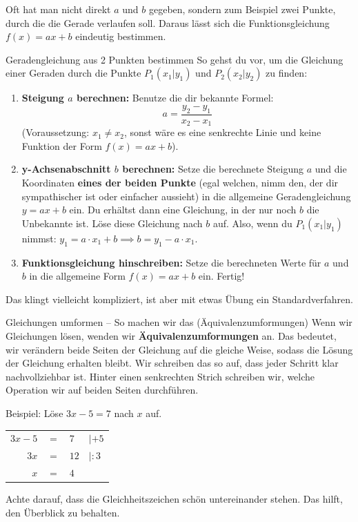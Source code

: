 Oft hat man nicht direkt $a$ und $b$ gegeben, sondern zum Beispiel zwei Punkte, durch die die Gerade verlaufen soll. Daraus lässt sich die Funktionsgleichung $f(x) = ax + b$ eindeutig bestimmen.

\begin{merksatzumgebung}{Geradengleichung aus 2 Punkten bestimmen}
So gehst du vor, um die Gleichung einer Geraden durch die Punkte $P_1(x_1|y_1)$ und $P_2(x_2|y_2)$ zu finden:
\begin{enumerate}
    \item \textbf{Steigung $a$ berechnen:}
    Benutze die dir bekannte Formel:
    \[ a = \frac{y_2 - y_1}{x_2 - x_1} \]
    (Voraussetzung: $x_1 \neq x_2$, sonst wäre es eine senkrechte Linie und keine Funktion der Form $f(x)=ax+b$).

    \item \textbf{y-Achsenabschnitt $b$ berechnen:}
    Setze die berechnete Steigung $a$ und die Koordinaten \textbf{eines der beiden Punkte} (egal welchen, nimm den, der dir sympathischer ist oder einfacher aussieht) in die allgemeine Geradengleichung $y = ax + b$ ein. Du erhältst dann eine Gleichung, in der nur noch $b$ die Unbekannte ist. Löse diese Gleichung nach $b$ auf.
    Also, wenn du $P_1(x_1|y_1)$ nimmst: $y_1 = a \cdot x_1 + b \implies b = y_1 - a \cdot x_1$.

    \item \textbf{Funktionsgleichung hinschreiben:}
    Setze die berechneten Werte für $a$ und $b$ in die allgemeine Form $f(x) = ax + b$ ein. Fertig!
\end{enumerate}
\end{merksatzumgebung}

Das klingt vielleicht kompliziert, ist aber mit etwas Übung ein Standardverfahren.

\begin{infoboxumgebung}{Gleichungen umformen – So machen wir das (Äquivalenzumformungen)}
Wenn wir Gleichungen lösen, wenden wir \textbf{Äquivalenzumformungen} an. Das bedeutet, wir verändern beide Seiten der Gleichung auf die gleiche Weise, sodass die Lösung der Gleichung erhalten bleibt. Wir schreiben das so auf, dass jeder Schritt klar nachvollziehbar ist. Hinter einen senkrechten Strich schreiben wir, welche Operation wir auf beiden Seiten durchführen.

Beispiel: Löse $3x - 5 = 7$ nach $x$ auf.
\begin{center}
\begin{tabular}{r @{\,} c @{\,} l @{\quad\quad} l} %
$3x - 5$ & $=$ & $7$ & $| +5$ \\
$3x$ & $=$ & $12$ & $| :3$ \\
$x$ & $=$ & $4$ & \\
\end{tabular}
\end{center}
Achte darauf, dass die Gleichheitszeichen schön untereinander stehen. Das hilft, den Überblick zu behalten.
\end{infoboxumgebung}

